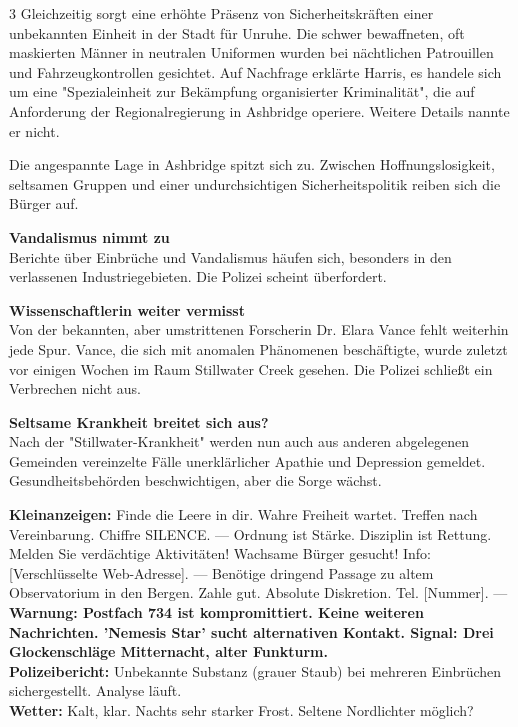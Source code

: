 \documentclass[10pt, a4paper]{article}
\newcommand{\articlesep}{\vspace{0.6em}}
\begin{document}
\begin{multicols}{3}
Gleichzeitig sorgt eine erhöhte Präsenz von Sicherheitskräften einer unbekannten Einheit in der Stadt für Unruhe. Die schwer bewaffneten, oft maskierten Männer in neutralen Uniformen wurden bei nächtlichen Patrouillen und Fahrzeugkontrollen gesichtet. Auf Nachfrage erklärte Harris, es handele sich um eine "Spezialeinheit zur Bekämpfung organisierter Kriminalität", die auf Anforderung der Regionalregierung in Ashbridge operiere. Weitere Details nannte er nicht.

Die angespannte Lage in Ashbridge spitzt sich zu. Zwischen Hoffnungslosigkeit, seltsamen Gruppen und einer undurchsichtigen Sicherheitspolitik reiben sich die Bürger auf.

\hrulefill

\articlesep
\large \textbf{Vandalismus nimmt zu} \normalsize \\
Berichte über Einbrüche und Vandalismus häufen sich, besonders in den verlassenen Industriegebieten. Die Polizei scheint überfordert.

\articlesep
\large \textbf{Wissenschaftlerin weiter vermisst} \normalsize \\
Von der bekannten, aber umstrittenen Forscherin Dr. Elara Vance fehlt weiterhin jede Spur. Vance, die sich mit anomalen Phänomenen beschäftigte, wurde zuletzt vor einigen Wochen im Raum Stillwater Creek gesehen. Die Polizei schließt ein Verbrechen nicht aus.

\articlesep
\large \textbf{Seltsame Krankheit breitet sich aus?} \normalsize \\
Nach der "Stillwater-Krankheit" werden nun auch aus anderen abgelegenen Gemeinden vereinzelte Fälle unerklärlicher Apathie und Depression gemeldet. Gesundheitsbehörden beschwichtigen, aber die Sorge wächst.

\hrulefill

\small
\textbf{Kleinanzeigen:} Finde die Leere in dir. Wahre Freiheit wartet. Treffen nach Vereinbarung. Chiffre SILENCE. --- Ordnung ist Stärke. Disziplin ist Rettung. Melden Sie verdächtige Aktivitäten! Wachsame Bürger gesucht! Info: [Verschlüsselte Web-Adresse]. --- Benötige dringend Passage zu altem Observatorium in den Bergen. Zahle gut. Absolute Diskretion. Tel. [Nummer]. --- \textbf{Warnung: Postfach 734 ist kompromittiert. Keine weiteren Nachrichten. 'Nemesis Star' sucht alternativen Kontakt. Signal: Drei Glockenschläge Mitternacht, alter Funkturm.} \\
\textbf{Polizeibericht:} Unbekannte Substanz (grauer Staub) bei mehreren Einbrüchen sichergestellt. Analyse läuft. \\
\textbf{Wetter:} Kalt, klar. Nachts sehr starker Frost. Seltene Nordlichter möglich? \\
\normalsize

\end{multicols}
\end{document}
